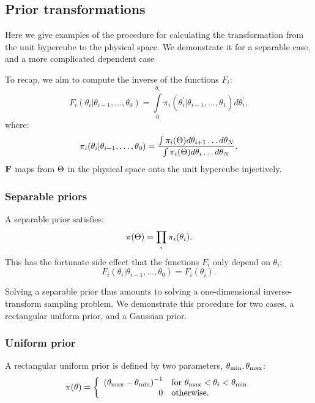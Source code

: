 \subsection{Prior transformations}
\label{sec:pc:prior_transformations}
Here we give examples of the procedure for calculating the transformation from the unit hypercube to the physical space. We demonstrate it for a separable case, and a more complicated dependent case

To recap, we aim to compute the inverse of the functions \(F_i\): 
\begin{equation}
  F_i(\theta_i|\theta_{i-1},\ldots,\theta_0) = \int\limits_0^{\theta_i} \pi_i(\theta_i^\prime|\theta_{i-1},\ldots,\theta_1) d\theta_i^\prime,
  \label{eqn:pc:appFi}
\end{equation}
%
where:
%
\begin{equation}
  \pi_i(\theta_i|\theta_{i-1},\ldots,\theta_0) 
  =
  \frac{%
    \int \pi_i(\params) d\theta_{i+1}\ldots d\theta_{N}
  }{%
    \int \pi_i(\params) d\theta_{i}\ldots d\theta_{N}
  }.
  \label{eqn:pc:apppii}
\end{equation}
\(\mathbf{F}\) maps from \(\Theta\) in the physical space onto the unit hypercube injectively. 



\subsubsection{Separable priors}
\label{sec:pc:separable_priors}
A separable prior satisfies:
\begin{equation}
  \pi(\Theta) = \prod_i\pi_i(\theta_i).
  \label{eqn:pc:separability}
\end{equation}
This has the fortunate side effect that the functions \(F_i\) only depend on \(\theta_i\):
\begin{equation}
  F_i(\theta_i|\theta_{i-1},\ldots,\theta_0) = F_i(\theta_i).
\end{equation}

Solving a separable prior thus amounts to solving a one-dimensional inverse-transform sampling problem. We demonstrate this procedure for two cases, a rectangular uniform prior, and a Gaussian prior.

\subsubsection{Uniform prior}
\label{sec:pc:uniform_prior}
\newcommand{\thetamin}{\theta_\smin} %
\newcommand{\thetamax}{\theta_\smax} %
A rectangular uniform prior is defined by two parameters, \({\thetamin,\thetamax}\):
\begin{equation}
  \pi(\theta) = 
  \left\{
    \begin{array}{rl}
      {(\thetamax - \thetamin)}^{-1} 
      &
      \text{for }\thetamax<\theta_i<\thetamin \\
      0 & \text{otherwise.}
    \end{array}
  \right.
\label{eqn:pc:uniform_prior}
\end{equation}

